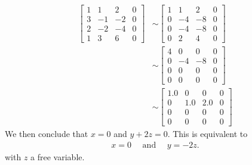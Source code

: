 \documentclass[12pt]{article}
\begin{document}
	 \begin{align*}
	 \left[\begin{matrix}1 & 1 & 2 & 0\\3 & -1 & -2 & 0\\2 & -2 & -4 & 0\\1 & 3 & 6 & 0\end{matrix}\right] 
	 & \sim \left[\begin{matrix}1 & 1 & 2 & 0\\0 & -4 & -8 & 0\\0 & -4 & -8 & 0\\0 & 2 & 4 & 0\end{matrix}\right] \\
	 & \sim \left[\begin{matrix}4 & 0 & 0 & 0\\0 & -4 & -8 & 0\\0 & 0 & 0 & 0\\0 & 0 & 0 & 0\end{matrix}\right] \\
	 & \sim \left[\begin{matrix}1.0 & 0 & 0 & 0\\0 & 1.0 & 2.0 & 0\\0 & 0 & 0 & 0\\0 & 0 & 0 & 0\end{matrix}\right]
	 \end{align*}
	We then conclude that $x = 0$ and $y + 2z = 0$. This is equivalent to 
		\begin{align*}
		x = 0 \quad \text{ and } \quad y = -2z .
		\end{align*}
	with $z$ a free variable.
	
	
\end{document}
